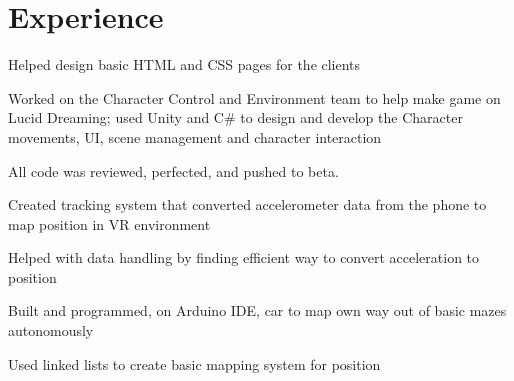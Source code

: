 \documentclass[]{deedy-resume-openfont}
\begin{document}
\begin{minipage}[t]{0.66\textwidth} 


\section{Experience}

\vspace{\topsep} %
\begin{tightemize}
\item Helped design basic HTML and CSS pages for the clients
\end{tightemize}
\sectionsep

\begin{tightemize}
\item Worked on the Character Control and Environment team to help make game on Lucid Dreaming; used Unity and C\# to design and develop the Character movements, UI, scene management and character interaction
\item All code was reviewed, perfected, and pushed to beta.
\end{tightemize}
\sectionsep

\begin{tightemize}
\item Created tracking system that converted accelerometer data from the phone to map position in VR environment
\item Helped with data handling by finding efficient way to convert acceleration to position
\end{tightemize}
\sectionsep

\begin{tightemize}
\item Built and programmed, on Arduino IDE, car to map own way out of basic mazes autonomously
\item Used linked lists to create basic mapping system for position
\end{tightemize}
\sectionsep


\end{minipage}
\end{document}
